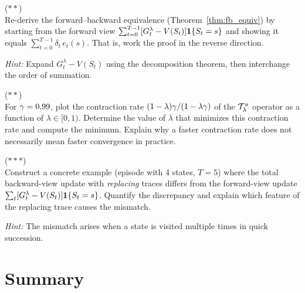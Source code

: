 \documentclass[11pt,a4paper]{article}
\begin{document}
\begin{exercise}
\textnormal{(\(**\))} \\
Re-derive the forward--backward equivalence
(Theorem~\ref{thm:fb_equiv}) by starting from the forward view
$\sum_{t=0}^{T-1} [G_t^\lambda - V(S_t)] \mathbf{1}\{S_t = s\}$
and showing it equals $\sum_{t=0}^{T-1} \delta_t\,e_t(s)$. That is,
work the proof in the reverse direction.

\textit{Hint:} Expand $G_t^\lambda - V(S_t)$ using the decomposition
theorem, then interchange the order of summation.
\end{exercise}

\begin{exercise}
\textnormal{(\(**\))} \\
For $\gamma = 0.99$, plot the contraction rate
$(1-\lambda)\gamma/(1 - \lambda\gamma)$ of the
$\mathcal{T}_\lambda^\pi$ operator as a function of
$\lambda \in [0, 1)$. Determine the value of $\lambda$ that minimizes
this contraction rate and compute the minimum. Explain why a faster
contraction rate does not necessarily mean faster convergence in
practice.
\end{exercise}

\begin{exercise}
\textnormal{(\(***\))} \\
Construct a concrete example (episode with 4 states, $T = 5$) where
the total backward-view update with \emph{replacing} traces differs
from the forward-view update $\sum_t [G_t^\lambda - V(S_t)]
\mathbf{1}\{S_t = s\}$. Quantify the discrepancy and explain which
feature of the replacing trace causes the mismatch.

\textit{Hint:} The mismatch arises when a state is visited multiple
times in quick succession.
\end{exercise}

\section{Summary}
\label{sec:summary}
\end{document}
